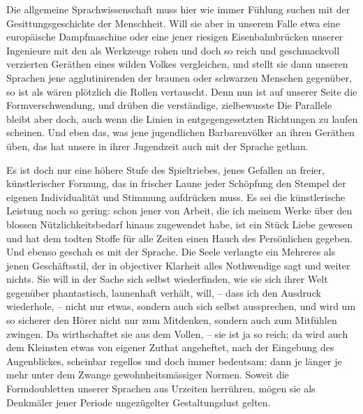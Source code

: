 Die allgemeine Sprachwissenschaft muss hier wie immer Fühlung suchen mit der Gesittungsgeschichte der Menschheit. Will sie aber in unserem Falle etwa eine europäische Dampfmaschine oder eine jener riesigen Eisenbahnbrücken unserer Ingenieure mit den als Werkzeuge rohen und doch so reich und geschmackvoll verzierten Geräthen eines wilden Volkes vergleichen, und stellt sie dann unseren Sprachen jene agglutinirenden der braunen oder schwarzen Menschen gegenüber, so ist  als wären plötzlich die Rollen vertauscht. Denn nun ist auf unserer \label{fp.344} Seite die Formverschwendung, und drüben die verständige, zielbewusste  Die Parallele bleibt aber doch, auch wenn die Linien in entgegengesetzten Richtungen zu laufen scheinen. Und eben das, was jene jugendlichen Barbarenvölker an ihren Geräthen üben, das hat unsere  in ihrer Jugendzeit auch mit der Sprache gethan.

Es ist doch nur eine höhere Stufe des Spieltriebes, jenes Gefallen an freier, künstlerischer Formung, das in frischer Laune jeder Schöpfung den Stempel der eigenen Individualität und Stimmung aufdrücken muss. Es sei die künstlerische Leistung noch so gering: schon jener  von Arbeit, die ich meinem Werke über den blossen Nützlichkeitsbedarf hinaus zugewendet habe, ist ein Stück Liebe gewesen und hat dem todten Stoffe für alle Zeiten einen Hauch des Persönlichen gegeben. Und ebenso geschah es mit der Sprache. Die Seele verlangte ein Mehreres als jenen Geschäftsstil, der in objectiver Klarheit alles Nothwendige sagt und weiter nichts. Sie will in der Sache sich selbst wiederfinden, wie sie sich ihrer Welt gegenüber  phantastisch, launenhaft verhält, will, – dass ich den Ausdruck wiederhole, – nicht nur etwas, sondern auch sich selbst aussprechen, und wird um so sicherer den Hörer nicht nur zum Mitdenken, sondern auch zum Mitfühlen zwingen. Da wirthschaftet sie aus dem Vollen, – sie ist ja so reich; da \label{fp.213} wird auch dem Kleinsten etwas von eigener Zuthat angeheftet,  nach der Eingebung des Augenblickes, scheinbar \label{sp.362} regellos und doch immer bedeutsam; dann je länger je mehr unter dem Zwange gewohnheitsmässiger Normen. Soweit die Formdoubletten unserer Sprachen aus Urzeiten herrühren, mögen sie als Denkmäler jener Periode ungezügelter Gestaltungslust gelten.

